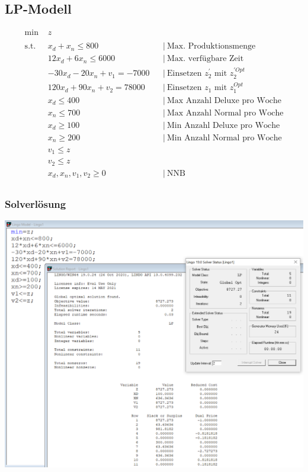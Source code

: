 \documentclass[a4paper,11pt]{article}
\begin{document}
\subsection*{LP-Modell}

\begin{align*}
    \text{min } &z \\~\\
    \text{s.t. } & x_{d} + x_{n} \le 800 && \big|~ \text{Max. Produktionsmenge} \\
    & 12x_{d} + 6x_{n} \le 6000 && \big|~ \text{Max. verfügbare Zeit} \\
    & -30x_{d} -20x_{n} + v_{1} = -7000 && \big|~ \text{Einsetzen $z_{2}^{'}$ mit $z_{2}^{'Opt}$ } \\
    & 120x_{d} + 90x_{n} + v_{2} = 78000 && \big|~ \text{Einsetzen $z_{1}$ mit $z_{1}^{Opt}$ } \\
    & x_{d} \le 400 && \big|~ \text{Max Anzahl Deluxe pro Woche} \\
    & x_{n} \le 700 && \big|~ \text{Max Anzahl Normal pro Woche} \\
    & x_{d} \ge 100 && \big|~ \text{Min Anzahl Deluxe pro Woche} \\
    & x_{n} \ge 200 && \big|~ \text{Min Anzahl Normal pro Woche} \\
    & v_{1} \le z &&  \text{} \\
    & v_{2} \le z && \text{} \\
    & x_{d}, x_{n}, v_1, v_2 \ge 0 && \big|~ \text{NNB} \\
\end{align*}

\subsubsection*{Solverlösung}

\includegraphics[width=1\linewidth]{src/blatt_7_aufgabe_2_solverloesung_3.png}
\end{document}
